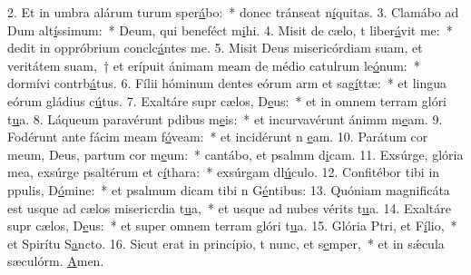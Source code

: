 2. Et in umbra alárum turum sper\uline{á}bo:~* donec tránseat n\uline{í}quitas.
3. Clamábo ad Dum alt\uline{í}ssimum:~* Deum, qui beneféct m\uline{i}hi.
4. Misit de cælo, t liber\uline{á}vit me:~* dedit in oppróbrium conclc\uline{á}ntes me.
5. Misit Deus misericórdiam suam, et veritátem suam,~† et erípuit ánimam meam de médio catulrum le\uline{ó}num:~* dormívi contrb\uline{á}tus.
6. Fílii hóminum dentes eórum arm et sag\uline{í}ttæ:~* et lingua eórum gládius c\uline{ú}tus.
7. Exaltáre supr cælos, D\uline{e}us:~* et in omnem terram glóri t\uline{u}a.
8. Láqueum paravérunt pdibus m\uline{e}is:~* et incurvavérunt ánimm m\uline{e}am.
9. Fodérunt ante fácim meam f\uline{ó}veam:~* et incidérunt n \uline{e}am.
10. Parátum cor meum, Deus, partum cor m\uline{e}um:~* cantábo, et psalmm d\uline{i}cam.
11. Exsúrge, glória mea, exsúrge psaltérum et c\uline{í}thara:~* exsúrgam dl\uline{ú}culo.
12. Confitébor tibi in ppulis, D\uline{ó}mine:~* et psalmum dicam tibi n G\uline{é}ntibus:
13. Quóniam magnificáta est usque ad cælos misericrdia t\uline{u}a,~* et usque ad nubes vérits t\uline{u}a.
14. Exaltáre supr cælos, D\uline{e}us:~* et super omnem terram glóri t\uline{u}a.
15. Glória Ptri, et F\uline{í}lio,~* et Spirítu S\uline{a}ncto.
16. Sicut erat in princípio, t nunc, et s\uline{e}mper,~* et in sǽcula sæculórm. \uline{A}men.
